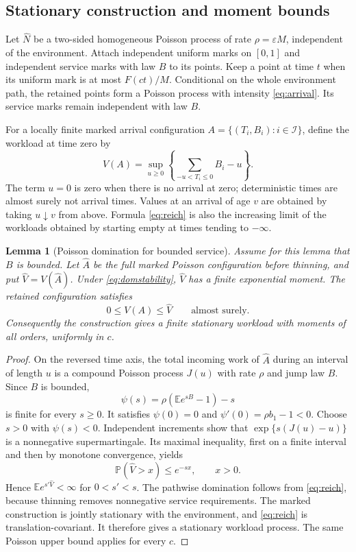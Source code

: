 \documentclass[11pt,reqno]{amsart}
\numberwithin{equation}{section}
\theoremstyle{plain}
\newtheorem{lemma}[theorem]{Lemma}
\theoremstyle{definition}
\newcommand{\E}{\mathbb E}
\newcommand{\Pp}{\mathbb P}
\newcommand{\1}{\mathbf 1}
\newcommand{\eps}{\varepsilon}
\begin{document}
\subsection{Stationary construction and moment bounds}
Let $\widehat N$ be a two-sided homogeneous Poisson process of rate $\rho=\eps M$, independent of the environment. Attach independent uniform marks on $[0,1]$ and independent service marks with law $B$ to its points. Keep a point at time $t$ when its uniform mark is at most $F(ct)/M$. Conditional on the whole environment path, the retained points form a Poisson process with intensity \eqref{eq:arrival}. Its service marks remain independent with law $B$.

For a locally finite marked arrival configuration $A=\{(T_i,B_i):i\in\mathcal I\}$, define the workload at time zero by
\begin{equation}\label{eq:reich}
 V(A)=\sup_{u\ge0}\left\{\sum_{-u<T_i\le0}B_i-u\right\}.
\end{equation}
The term $u=0$ is zero when there is no arrival at zero; deterministic times are almost surely not arrival times. Values at an arrival of age $v$ are obtained by taking $u\downarrow v$ from above. Formula \eqref{eq:reich} is also the increasing limit of the workloads obtained by starting empty at times tending to $-\infty$.

\begin{lemma}[Poisson domination for bounded service]\label{lem:domination}
Assume for this lemma that $B$ is bounded. Let $\widehat A$ be the full marked Poisson configuration before thinning, and put $\widehat V=V(\widehat A)$. Under \eqref{eq:domstability}, $\widehat V$ has a finite exponential moment. The retained configuration satisfies
\[
 0\le V(A)\le\widehat V\qquad\text{almost surely}.
\]
Consequently the construction gives a finite stationary workload with moments of all orders, uniformly in $c$.
\end{lemma}
\begin{proof}
On the reversed time axis, the total incoming work of $\widehat A$ during an interval of length $u$ is a compound Poisson process $J(u)$ with rate $\rho$ and jump law $B$. Since $B$ is bounded,
\[
 \psi(s)=\rho(\E e^{sB}-1)-s
\]
is finite for every $s\ge0$. It satisfies $\psi(0)=0$ and $\psi'(0)=\rho b_1-1<0$. Choose $s>0$ with $\psi(s)<0$. Independent increments show that $\exp\{s(J(u)-u)\}$ is a nonnegative supermartingale. Its maximal inequality, first on a finite interval and then by monotone convergence, yields
\[
 \Pp(\widehat V>x)\le e^{-sx},\qquad x>0.
\]
Hence $\E e^{s'\widehat V}<\infty$ for $0<s'<s$. The pathwise domination follows from \eqref{eq:reich}, because thinning removes nonnegative service requirements. The marked construction is jointly stationary with the environment, and \eqref{eq:reich} is translation-covariant. It therefore gives a stationary workload process. The same Poisson upper bound applies for every $c$.
\end{proof}
\end{document}
